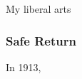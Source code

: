 \documentclass[../../../main.tex]{subfiles}
\begin{document}
My liberal arts 

\subsubsection{Safe Return}

In 1913, 
\end{document}

